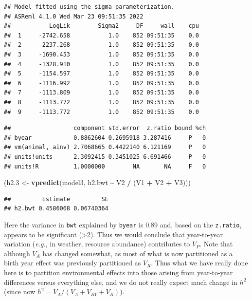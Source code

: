 \documentclass[
  12pt,
]{book}
\newenvironment{Shaded}{\begin{snugshade}}{\end{snugshade}}
\newcommand{\FloatTok}[1]{\textcolor[rgb]{0.00,0.00,0.81}{#1}}
\newcommand{\KeywordTok}[1]{\textcolor[rgb]{0.13,0.29,0.53}{\textbf{#1}}}
\newcommand{\NormalTok}[1]{#1}
\newcommand{\OperatorTok}[1]{\textcolor[rgb]{0.81,0.36,0.00}{\textbf{#1}}}
\newcommand{\StringTok}[1]{\textcolor[rgb]{0.31,0.60,0.02}{#1}}
\begin{document}
\begin{verbatim}
## Model fitted using the sigma parameterization.
## ASReml 4.1.0 Wed Mar 23 09:51:35 2022
##           LogLik        Sigma2     DF     wall    cpu
##  1     -2742.658           1.0    852 09:51:35    0.0
##  2     -2237.268           1.0    852 09:51:35    0.0
##  3     -1690.453           1.0    852 09:51:35    0.0
##  4     -1328.910           1.0    852 09:51:35    0.0
##  5     -1154.597           1.0    852 09:51:35    0.0
##  6     -1116.992           1.0    852 09:51:35    0.0
##  7     -1113.809           1.0    852 09:51:35    0.0
##  8     -1113.772           1.0    852 09:51:35    0.0
##  9     -1113.772           1.0    852 09:51:35    0.0
\end{verbatim}

\begin{Shaded}
\end{Shaded}

\begin{verbatim}
##                  component std.error  z.ratio bound %ch
## byear            0.8862604 0.2695918 3.287416     P   0
## vm(animal, ainv) 2.7068665 0.4422140 6.121169     P   0
## units!units      2.3092415 0.3451025 6.691466     P   0
## units!R          1.0000000        NA       NA     F   0
\end{verbatim}

\begin{Shaded}
\begin{Highlighting}[]
\NormalTok{(h2}\FloatTok{.3}\NormalTok{ \textless{}{-}}\StringTok{ }\KeywordTok{vpredict}\NormalTok{(model3, h2.bwt }\OperatorTok{\textasciitilde{}}\StringTok{ }\NormalTok{V2 }\OperatorTok{/}\StringTok{ }\NormalTok{(V1 }\OperatorTok{+}\StringTok{ }\NormalTok{V2 }\OperatorTok{+}\StringTok{ }\NormalTok{V3)))}
\end{Highlighting}
\end{Shaded}

\begin{verbatim}
##         Estimate         SE
## h2.bwt 0.4586068 0.06740364
\end{verbatim}

Here the variance in \texttt{bwt} explained by \texttt{byear} is 0.89 and, based on the \texttt{z.ratio}, appears to be significant (\textgreater2). Thus we would conclude that year-to-year variation (\emph{e.g.}, in weather, resource abundance) contributes to \(V_P\). Note that although \(V_A\) has changed somewhat, as most of what is now partitioned as a birth year effect was previously partitioned as \(V_R\). Thus what we have really done here is to partition environmental effects into those arising from year-to-year differences versus everything else, and we do not really expect much change in \(h^2\) (since now \(h^2 = V_A/ (V_A+V_{BY}+V_R)\)).
\end{document}
